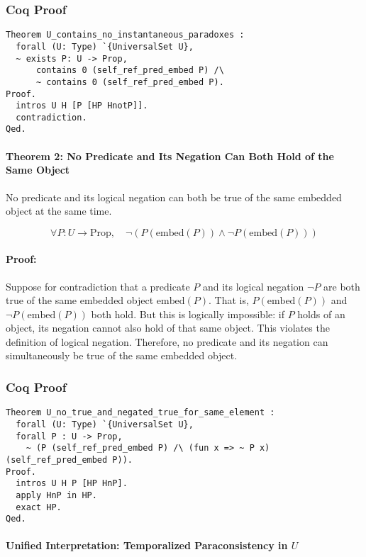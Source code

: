 \documentclass[12pt]{article}
\begin{document}
\subsubsection{Coq Proof}
\begin{lstlisting}[language=Coq]
Theorem U_contains_no_instantaneous_paradoxes :
  forall (U: Type) `{UniversalSet U},
  ~ exists P: U -> Prop,
      contains 0 (self_ref_pred_embed P) /\
      ~ contains 0 (self_ref_pred_embed P).
Proof.
  intros U H [P [HP HnotP]].
  contradiction.
Qed.
\end{lstlisting}


\paragraph{Theorem 2: No Predicate and Its Negation Can Both Hold of the Same Object}
No predicate and its logical negation can both be true of the same embedded object at the same time.

\[
\forall P : U \to \text{Prop}, \quad
\neg \left( P(\text{embed}(P)) \wedge \neg P(\text{embed}(P)) \right)
\]

\paragraph{Proof:}

Suppose for contradiction that a predicate \( P \) and its logical negation \( \neg P \) are both true of the same embedded object \( \text{embed}(P) \). That is, \( P(\text{embed}(P)) \) and \( \neg P(\text{embed}(P)) \) both hold. But this is logically impossible: if \( P \) holds of an object, its negation cannot also hold of that same object. This violates the definition of logical negation. Therefore, no predicate and its negation can simultaneously be true of the same embedded object.


\subsubsection{Coq Proof}
\begin{lstlisting}[language=Coq]
Theorem U_no_true_and_negated_true_for_same_element :
  forall (U: Type) `{UniversalSet U},
  forall P : U -> Prop,
    ~ (P (self_ref_pred_embed P) /\ (fun x => ~ P x) (self_ref_pred_embed P)).
Proof.
  intros U H P [HP HnP].
  apply HnP in HP.
  exact HP.
Qed.
\end{lstlisting}


\paragraph{Unified Interpretation: Temporalized Paraconsistency in \( U \)}
\end{document}
